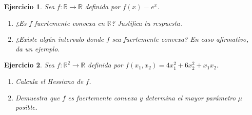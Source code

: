 \documentclass[11pt]{report}
\newtheorem{ex}{Ejercicio}
\begin{document}
\begin{ex}
  Sea \( f: \mathbb{R} \to \mathbb{R} \) definida por \( f(x) = e^x \).
  \begin{enumerate}
    \item ¿Es \( f \) fuertemente convexa en \( \mathbb{R} \)? Justifica tu respuesta.
    \item ¿Existe algún intervalo donde \( f \) sea fuertemente convexa? En caso afirmativo, da un ejemplo.
  \end{enumerate}

\end{ex}

\begin{ex}
  Sea \( f: \mathbb{R}^2 \to \mathbb{R} \) definida por \( f(x_1, x_2) = 4x_1^2 + 6x_2^2 
  + x_1 x_2
  \).
  \begin{enumerate}
    \item Calcula el Hessiano de \( f \).
    \item Demuestra que \( f \) es fuertemente convexa y determina el mayor parámetro \( \mu \) posible.
  \end{enumerate}

\end{ex}
\end{document}
